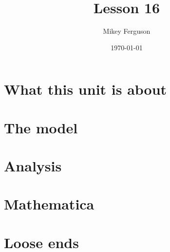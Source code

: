 \documentclass[11pt]{article}
\title{Lesson 16}
\author{Mikey Ferguson}
\date{\today}
\begin{document}
\maketitle
\tableofcontents
\bigskip

\section{What this unit is about}

\section{The model}

\section{Analysis}

\section{Mathematica}

\section{Loose ends}
\end{document}
